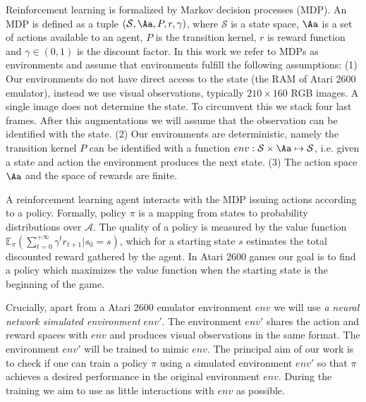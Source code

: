 Reinforcement learning is formalized by Markov decision processes (MDP). An MDP is defined as a tuple $(\mathcal{S}, \Aa, P, r, \gamma)$, where $\mathcal{S}$ is a state space, $\Aa$ is a set of actions available to an agent, $P$ is the transition kernel, $r$ is reward function and $\gamma\in (0,1)$ is the discount factor. 
In this work we refer to MDPs as environments and assume that environments fulfill the following assumptions:%
(1) Our environments do not have direct access to the state (the RAM of Atari 2600 emulator), instead we use visual observations, typically $210\times 160$ RGB images. A single image does not determine the state. To circumvent this we stack four last frames. %
  After this augmentations we will assume that the observation can be identified with the state. %
(2) Our environments are deterministic, namely the transition kernel $P$ can be identified with a function $env:\mathcal{S}\times \Aa\mapsto \mathcal{S}$, i.e. given a state and action the environment produces the next state. 
(3) The action space $\Aa$ and the space of rewards are finite. 

A reinforcement learning agent interacts with the MDP issuing actions according to a policy. Formally, policy $\pi$ is a mapping from states to probability distributions over $\mathcal{A}$. The quality of a policy is measured by the value function $\mathbb{E}_{\pi}\left(\sum_{t=0}^{+\infty}\gamma^t r_{t+1}|s_0=s \right)$, which for a starting state $s$ estimates the total discounted reward gathered by the agent. In Atari 2600 games our goal is to find a policy which maximizes the value function when the starting state is the beginning of the game.

Crucially, apart from a Atari 2600 emulator environment $env$ we will use \textit{a neural network simulated environment} $env'$. The environment $env'$ shares the action and reward spaces with $env$ and produces visual observations in the same format. The  environment $env'$ will be trained to mimic $env$.  The principal aim of our work is to check if one can train a policy $\pi$ using a simulated environment $env'$ so that $\pi$ achieves a desired performance in the original environment $env$. During the training we aim to use as little interactions with $env$ as possible. %

